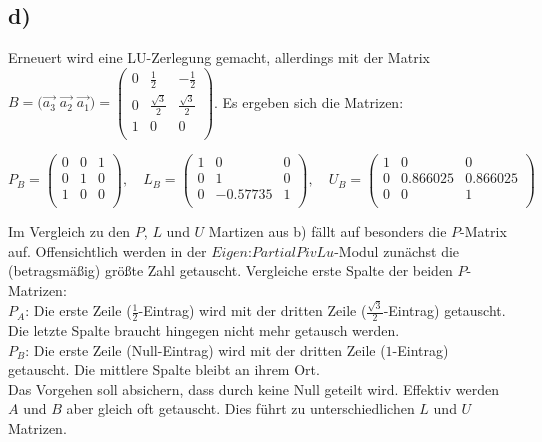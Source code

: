 \subsection*{d)}

Erneuert wird eine LU-Zerlegung gemacht, allerdings mit der Matrix
$B = \biggl(\vec{a_3}\;\vec{a_2}\;\vec{a_1}\biggr) =
\left(\begin{array}{rrr}
  0  & \frac{1}{2}         & -\frac{1}{2}       \\
  0  & \frac{\sqrt{3}}{2}  & \frac{\sqrt{3}}{2} \\
  1  & 0                   & 0                  \\
\end{array}\right)$. Es ergeben sich die Matrizen:

\begin{equation*}
  P_B =
  \left(\begin{array}{rrr}
    0 & 0 & 1 \\
    0 & 1 & 0 \\
    1 & 0 & 0 \\
  \end{array}\right),
  \quad
  L_B =
  \left(\begin{array}{rrr}
    1 &  0          & 0 \\
    0 &  1          & 0 \\
    0 & -0.57735    & 1 \\
  \end{array}\right),
  \quad
  U_B =
  \left(\begin{array}{rrr}
    1 & 0           & 0        \\
    0 & 0.866025    & 0.866025 \\
    0 & 0           & 1        \\
  \end{array}\right)
\end{equation*}

\noindent
Im Vergleich zu den $P$, $L$ und $U$ Martizen aus b) fällt auf besonders die $P$-Matrix auf.
Offensichtlich werden in der $\textit{Eigen:PartialPivLu}$-Modul zunächst
die (betragsmäßig) größte Zahl getauscht. Vergleiche erste Spalte der beiden $P$-Matrizen:\\
$P_A$: Die erste Zeile ($\frac{1}{2}$-Eintrag) wird mit der dritten Zeile
($\frac{\sqrt{3}}{2}$-Eintrag) getauscht. Die letzte Spalte braucht hingegen nicht mehr getausch werden.\\
$P_B$: Die erste Zeile (Null-Eintrag) wird mit der dritten Zeile ($1$-Eintrag) getauscht.
Die mittlere Spalte bleibt an ihrem Ort.\\
Das Vorgehen soll absichern, dass durch keine Null geteilt wird. Effektiv werden
$A$ und $B$ aber gleich oft getauscht. Dies führt zu unterschiedlichen $L$ und
$U$ Matrizen.

